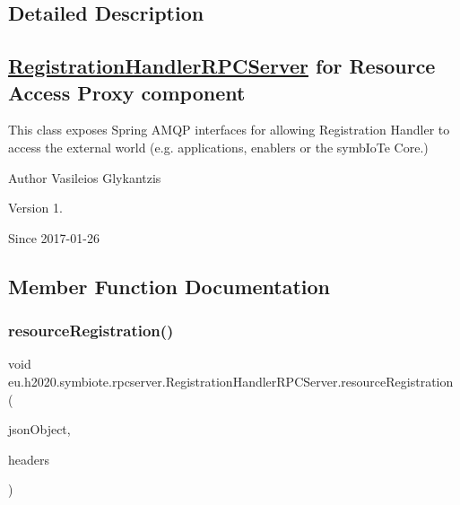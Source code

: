 \subsection{Detailed Description}
\subsection*{\hyperlink{classeu_1_1h2020_1_1symbiote_1_1rpcserver_1_1RegistrationHandlerRPCServer}{Registration\+Handler\+R\+P\+C\+Server} for Resource Access Proxy component}

This class exposes Spring A\+M\+QP interfaces for allowing Registration Handler to access the external world (e.\+g. applications, enablers or the symb\+Io\+Te Core.)

\begin{DoxyAuthor}{Author}
Vasileios Glykantzis 
\end{DoxyAuthor}
\begin{DoxyVersion}{Version}
1. 
\end{DoxyVersion}
\begin{DoxySince}{Since}
2017-\/01-\/26 
\end{DoxySince}


\subsection{Member Function Documentation}
\mbox{\label{classeu_1_1h2020_1_1symbiote_1_1rpcserver_1_1RegistrationHandlerRPCServer_a59d3a42c7b9a1b51b7956226abc1d66e}} 
\subsubsection{\texorpdfstring{resource\+Registration()}{resourceRegistration()}}
{\footnotesize\ttfamily void eu.\+h2020.\+symbiote.\+rpcserver.\+Registration\+Handler\+R\+P\+C\+Server.\+resource\+Registration (\begin{DoxyParamCaption}\item[{J\+S\+O\+N\+Object}]{json\+Object,  }\item[{@Headers() Map$<$ String, String $>$}]{headers }\end{DoxyParamCaption})}


